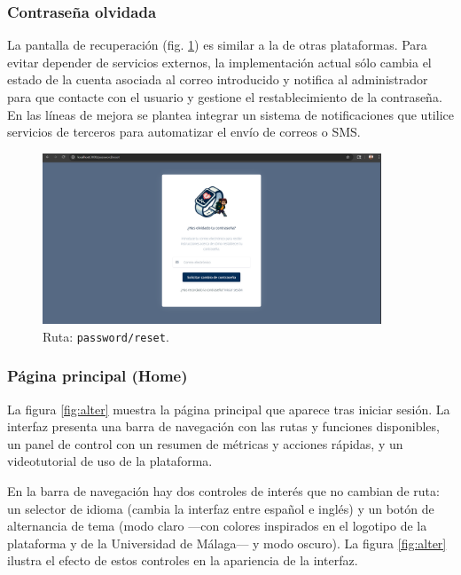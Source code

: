 \documentclass[12pt, a4paper]{article}
\begin{document}
\begin{umaappendices}
	\subsubsection{Contraseña olvidada}
	La pantalla de recuperación (fig. \ref{fig:olvide}) es similar a la de otras plataformas. Para evitar depender de servicios externos, la implementación actual sólo cambia el estado de la cuenta asociada al correo introducido y notifica al administrador para que contacte con el usuario y gestione el restablecimiento de la contraseña. En las líneas de mejora se plantea integrar un sistema de notificaciones que utilice servicios de terceros para automatizar el envío de correos o SMS.
	
	\begin{figure}[htbp]
		\centering
		\includegraphics[width=0.9\textwidth]{images/2_olvide.png}
		\caption[Ejemplo]{Ruta: \texttt{password/reset}.}
		\label{fig:olvide}
	\end{figure}
	
	\subsubsection{Página principal (Home)}
	La figura \ref{fig:alter} muestra la página principal que aparece tras iniciar sesión. La interfaz presenta una barra de navegación con las rutas y funciones disponibles, un panel de control con un resumen de métricas y acciones rápidas, y un videotutorial de uso de la plataforma.
	
	En la barra de navegación hay dos controles de interés que no cambian de ruta: un selector de idioma (cambia la interfaz entre español e inglés) y un botón de alternancia de tema (modo claro —con colores inspirados en el logotipo de la plataforma y de la Universidad de Málaga— y modo oscuro). La figura \ref{fig:alter} ilustra el efecto de estos controles en la apariencia de la interfaz.
	

\end{umaappendices}
\end{document}
